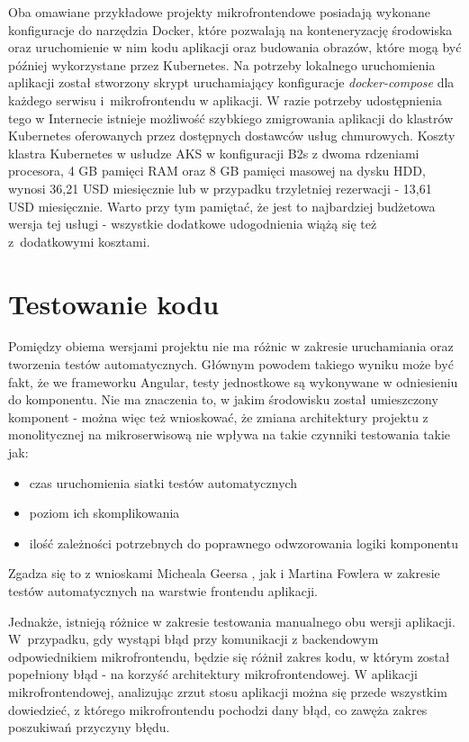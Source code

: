 \documentclass{SGGW-thesis}
\begin{document}
{  Oba omawiane przykładowe projekty mikrofrontendowe posiadają wykonane konfiguracje do narzędzia Docker, które pozwalają na konteneryzację środowiska oraz uruchomienie w nim kodu aplikacji oraz budowania obrazów, które mogą być później wykorzystane przez Kubernetes. Na potrzeby lokalnego uruchomienia aplikacji został stworzony skrypt uruchamiający konfiguracje \textit{docker-compose} dla każdego serwisu i~mikrofrontendu w aplikacji. W razie potrzeby udostępnienia tego w Internecie istnieje możliwość szybkiego zmigrowania aplikacji do klastrów Kubernetes oferowanych przez dostępnych dostawców usług chmurowych. Koszty klastra Kubernetes w usłudze AKS \cite{aks_calc} w konfiguracji B2s z dwoma rdzeniami procesora, 4 GB pamięci RAM oraz 8 GB pamięci masowej na dysku HDD, wynosi 36,21 USD miesięcznie lub w przypadku trzyletniej rezerwacji - 13,61 USD miesięcznie. Warto przy tym pamiętać, że jest to najbardziej budżetowa wersja tej usługi - wszystkie dodatkowe udogodnienia wiążą się też z~dodatkowymi kosztami.

  \section{Testowanie kodu}
  Pomiędzy obiema wersjami projektu nie ma różnic w zakresie uruchamiania oraz tworzenia testów automatycznych. Głównym powodem takiego wyniku może być fakt, że we frameworku Angular, testy jednostkowe są wykonywane w odniesieniu do komponentu. Nie ma znaczenia to, w jakim środowisku został umieszczony komponent - można więc też wnioskować, że zmiana architektury projektu z monolitycznej na mikroserwisową nie wpływa na takie czynniki testowania takie jak:
  
  \begin{itemize}
    \item czas uruchomienia siatki testów automatycznych
    \item poziom ich skomplikowania
    \item ilość zależności potrzebnych do poprawnego odwzorowania logiki komponentu
  \end{itemize}

  Zgadza się to z wnioskami Micheala Geersa \cite{geers_2020}, jak i Martina Fowlera \cite{fowler_2019} w zakresie testów automatycznych na warstwie frontendu aplikacji.

  Jednakże, istnieją różnice w zakresie testowania manualnego obu wersji aplikacji. W~przypadku, gdy wystąpi błąd przy komunikacji z backendowym odpowiednikiem mikrofrontendu, będzie się różnił zakres kodu, w którym został popełniony błąd - na korzyść architektury mikrofrontendowej. W aplikacji mikrofrontendowej, analizując zrzut stosu aplikacji można się przede wszystkim dowiedzieć, z którego mikrofrontendu pochodzi dany błąd, co zawęża zakres poszukiwań przyczyny błędu.

}
\end{document}
